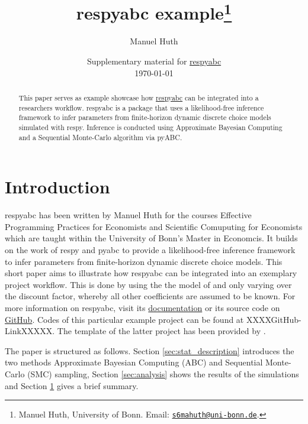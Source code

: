 \documentclass[11pt, a4paper, leqno]{article}
\begin{document}
\title{respyabc example\thanks{Manuel Huth, University of Bonn. Email: \href{mailto:s6mahuth@uni-bonn.de}{\nolinkurl{s6mahuth@uni-bonn.de}}.}}

\author{Manuel Huth}

\date{
    {Supplementary material for \href{https://respyabc.readthedocs.io/en/latest/index.html}{respyabc}}
    \\[1ex]
    \today
}

\maketitle


\begin{abstract}
This paper serves as example showcase how \href{https://respyabc.readthedocs.io/en/latest/index.html}{respyabc} can be integrated into a researchers workflow. respyabc is a package that uses a likelihood-free inference framework to infer parameters from finite-horizon dynamic discrete choice models simulated with respy. Inference is conducted using Approximate Bayesian Computing and a Sequential Monte-Carlo algorithm via pyABC.
\end{abstract}
\clearpage

\section{Introduction} %
\label{sec:introduction}
respyabc has been written by Manuel Huth for the courses Effective Programming Practices for Economists and Scientific Comuputing for Economists which are taught within the University of Bonn's Master in Economcis. It builds on the work of respy \citep{Gabler2020} and pyabc \citep{klinger2018} to provide a likelihood-free inference framework to infer parameters from finite-horizon dynamic discrete choice models. This short paper aims to illustrate how respyabc can be integrated into an exemplary project workflow. This is done by using the the model of \citet{keane1994} and only varying over the discount factor, whereby all other coefficients are assumed to be known. For more information on respyabc, visit its \href{https://respyabc.readthedocs.io/en/latest/index.html}{documentation} or its source code on \href{https://github.com/manuhuth/respyabc}{GitHub}. Codes of this particular example project can be found at XXXXGitHub-LinkXXXXX. The template of the latter project has been provided by \citet{GaudeckerEconProjectTemplates}.

The paper is structured as follows. Section \ref{sec:stat_description} introduces the two methods Approximate Bayesian Computing (ABC) and Sequential Monte-Carlo (SMC) sampling, Section \ref{sec:analysis} shows the results of the simulations and Section \ref{sec:introduction} gives a brief summary.
\end{document}

